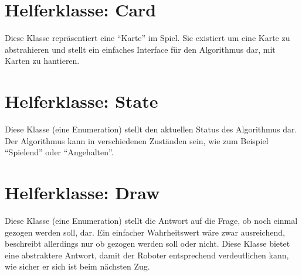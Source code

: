     \section{Helferklasse: Card}

        Diese Klasse repräsentiert eine ``Karte'' im Spiel.
        Sie existiert um eine Karte zu abstrahieren und stellt ein einfaches
        Interface für den Algorithmus dar, mit Karten zu hantieren.

    \section{Helferklasse: State}

        Diese Klasse (eine Enumeration) stellt den aktuellen Status des
        Algorithmus dar.
        Der Algorithmus kann in verschiedenen Zuständen sein, wie zum Beispiel
        ``Spielend'' oder ``Angehalten''.

    \section{Helferklasse: Draw}

        Diese Klasse (eine Enumeration) stellt die Antwort auf die Frage, ob
        noch einmal gezogen werden soll, dar.
        Ein einfacher Wahrheitswert wäre zwar ausreichend, beschreibt allerdings
        nur ob gezogen werden soll oder nicht.
        Diese Klasse bietet eine abstraktere Antwort, damit der Roboter
        entsprechend verdeutlichen kann, wie sicher er sich ist beim nächsten
        Zug.

